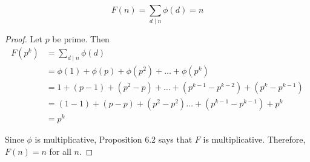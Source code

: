 \begin{prop}[part b]
    \[ F(n) = \sum_{d \mid n} \phi(d) = n \]
\end{prop}
\begin{proof}
    Let $p$ be prime. Then
    \begin{align*}
    F(p^k) &= \sum_{d \mid n} \phi(d) \\
           &= \phi(1) + \phi(p) + \phi(p^2) + \ldots + \phi(p^k) \\
           &= 1 + (p-1) + (p^2 - p) + \ldots + (p^{k-1} - p^{k-2}) + (p^k - p^{k-1}) \\
           &= (1-1) + (p-p) + (p^2 - p^2) \ldots + (p^{k-1} - p^{k-1}) + p^k \\
           &= p^k
    \end{align*}    

    Since $\phi$ is multiplicative, Proposition 6.2 says that $F$ is
    multiplicative. Therefore, $F(n) = n$ for all $n$.
\end{proof}
